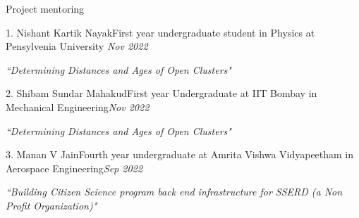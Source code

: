 \begin{section}{Project mentoring}
    \begin{subsectionnobullet}{1. Nishant Kartik Nayak}{First year undergraduate student in Physics at Pensylvenia University }{\textit{Nov 2022}}{}
        \item \textit{``Determining Distances and Ages of Open Clusters"}
    \end{subsectionnobullet}
            \vspace{-0.0em}
    \begin{subsectionnobullet}{2. Shibam Sundar Mahakud}{First year Undergraduate at IIT Bombay in Mechanical Engineering}{\textit{Nov 2022}}{}
        \item \textit{``Determining Distances and Ages of Open Clusters"}
    \end{subsectionnobullet}
    \vspace{-0.0em}

        \begin{subsectionnobullet}{3. Manan V Jain}{Fourth year undergraduate at Amrita Vishwa Vidyapeetham in Aerospace Engineering}{\textit{Sep 2022}}{}
        \item \textit{``Building Citizen Science program back end infrastructure for SSERD (a Non Profit Organization)"}  
    \end{subsectionnobullet}
\end{section}
